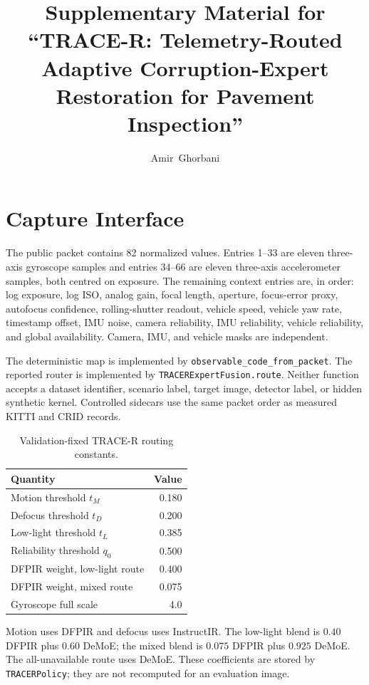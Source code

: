 \documentclass[journal]{IEEEtran}
\begin{document}
\title{Supplementary Material for ``TRACE-R: Telemetry-Routed Adaptive Corruption-Expert Restoration for Pavement Inspection''}
\author{Amir~Ghorbani}
\maketitle

\section{Capture Interface}
The public packet contains 82 normalized values. Entries 1--33 are eleven three-axis gyroscope samples and entries 34--66 are eleven three-axis accelerometer samples, both centred on exposure. The remaining context entries are, in order: log exposure, log ISO, analog gain, focal length, aperture, focus-error proxy, autofocus confidence, rolling-shutter readout, vehicle speed, vehicle yaw rate, timestamp offset, IMU noise, camera reliability, IMU reliability, vehicle reliability, and global availability. Camera, IMU, and vehicle masks are independent.

The deterministic map is implemented by \texttt{observable\_code\_from\_packet}. The reported router is implemented by \texttt{TRACERExpertFusion.route}. Neither function accepts a dataset identifier, scenario label, target image, detector label, or hidden synthetic kernel. Controlled sidecars use the same packet order as measured KITTI and CRID records.

\begin{table}[!t]
\centering
\caption{Validation-fixed TRACE-R routing constants.}
\label{tab:route_constants}
\footnotesize
\begin{tabular}{lr}
\toprule
Quantity & Value \\
\midrule
Motion threshold $t_M$ & 0.180 \\
Defocus threshold $t_D$ & 0.200 \\
Low-light threshold $t_L$ & 0.385 \\
Reliability threshold $q_0$ & 0.500 \\
DFPIR weight, low-light route & 0.400 \\
DFPIR weight, mixed route & 0.075 \\
Gyroscope full scale & 4.0 \\
\bottomrule
\end{tabular}
\end{table}

Motion uses DFPIR and defocus uses InstructIR. The low-light blend is $0.40$ DFPIR plus $0.60$ DeMoE; the mixed blend is $0.075$ DFPIR plus $0.925$ DeMoE. The all-unavailable route uses DeMoE. These coefficients are stored by \texttt{TRACERPolicy}; they are not recomputed for an evaluation image.
\end{document}
